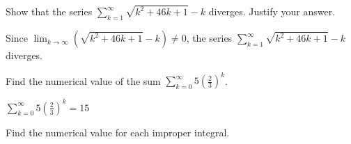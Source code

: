 \documentclass[12pt,fleqn,answers]{exam}
\begin{document}
\begin{questions}
    \newpage 
    \question   Show that the series $\displaystyle \sum_{k=1}^\infty \sqrt{k^2 + 46 k+ 1} - k$
    diverges. Justify your answer.
    \begin{solution}[2.50in]
        Since $\displaystyle \lim_{k \to \infty} \left(\sqrt{k^2 + 46 k+ 1} - k \right) \neq 0$, 
        the  series $\displaystyle \sum_{k=1}^\infty \sqrt{k^2 + 46 k+ 1} - k$ diverges.
    \end{solution}
    
    \question   Find the numerical value of the sum 
    $\sum_{k=0}^\infty 5 \left(\frac{2}{3} \right)^k$.
    
    \begin{solution}%
        $\sum_{k=0}^\infty 5 \left(\frac{2}{3} \right)^k = 15$
    \end{solution}
    
    \newpage 
    
    \question Find the numerical value for each improper integral.
    
    

\end{questions}
\end{document}
